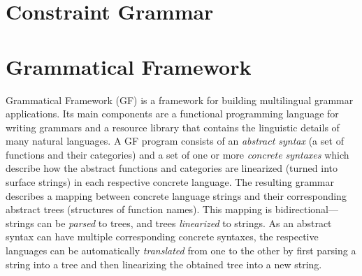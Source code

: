 \section{Constraint Grammar}
\label{sec:cg-intro}


\section{Grammatical Framework}
\label{sec:gf-intro}

Grammatical Framework (GF) \cite{ranta2011gfbook} 
is a framework for building multilingual grammar applications. Its main
components are a functional programming language for writing grammars
and a resource library that contains the linguistic details of many
natural languages.
A GF program consists of an \emph{abstract syntax} (a set of functions
and their categories) and a set of one or more
\emph{concrete syntaxes} which describe how the abstract
functions and categories are linearized (turned into surface strings) in each
respective concrete language. The resulting grammar
describes a mapping between concrete language strings and
their corresponding abstract trees (structures of function names).
This mapping is bidirectional---strings can be \emph{parsed} to
trees, and trees \emph{linearized} to strings.
As an abstract syntax can have multiple corresponding concrete syntaxes,
the respective languages can be automatically \emph{translated} from one to the other by
first parsing a string into a tree and then linearizing the obtained tree
into a new string.

